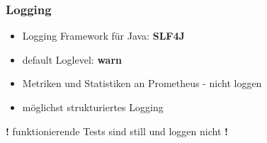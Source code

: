 \begin{frame}
\frametitle{Logging}
\begin{itemize}
  \item Logging Framework für Java: \textbf{SLF4J}
  \vspace{2mm}
  \item default Loglevel: \textbf{warn}
  \vspace{2mm}
  \item Metriken und Statistiken an Prometheus - nicht loggen
  \vspace{2mm}
  \item möglichst strukturiertes Logging
  \vspace{2mm}
\end{itemize}
  \begin{block}
    \par \centering \textbf{!} funktionierende Tests sind still und loggen nicht \textbf{!}
  \end{block}
\end{frame}
